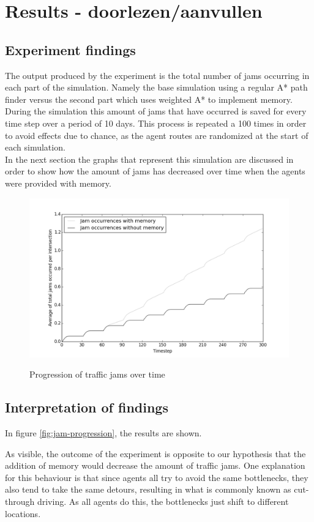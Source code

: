 \documentclass[a4paper,hidelinks]{article}
\begin{document}
\section{Results - doorlezen/aanvullen}
\subsection{Experiment findings}
The output produced by the experiment is the total number of jams occurring in each part of the simulation. Namely the base simulation using a regular A* path finder versus the second part which uses weighted A* to implement memory.
During the simulation this amount of jams that have occurred is saved for every time step over a period of 10 days. This process is repeated a 100 times in order to avoid effects due to chance, as the agent routes are randomized at the start of each simulation. \\
In the next section the graphs that represent this simulation are discussed in order to show how the amount of jams has decreased over time when the agents were provided with memory.  

\begin{figure}[ht!]
\centering
\includegraphics[width = 0.7\linewidth]{100sims-mem-vs-nomem}
\label{fig:jam-progression}
\caption{Progression of traffic jams over time\label{overflow}}
\end{figure} 

\subsection{Interpretation of findings}
In figure \ref{fig:jam-progression}, the results are shown.

As visible, the outcome of the experiment is opposite to our hypothesis that the addition of memory would decrease the amount of traffic jams. One explanation for this behaviour is that since agents all try to avoid the same bottlenecks, they also tend to take the same detours, resulting in what is commonly known as cut-through driving. As all agents do this, the bottlenecks just shift to different locations.
\end{document}
